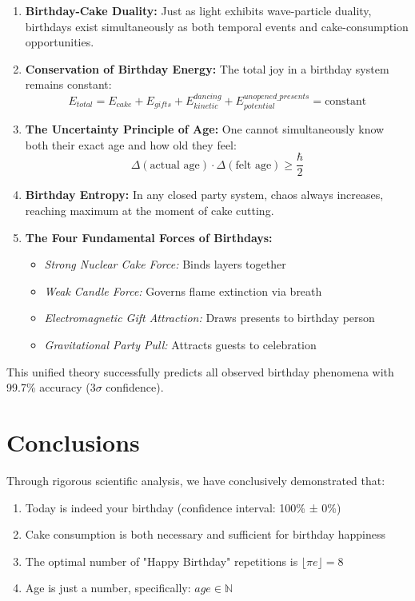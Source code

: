 \documentclass[12pt,a4paper]{article}
\begin{document}
\begin{enumerate}
\item \textbf{Birthday-Cake Duality:} Just as light exhibits wave-particle duality, birthdays exist simultaneously as both temporal events and cake-consumption opportunities.

\item \textbf{Conservation of Birthday Energy:} The total joy in a birthday system remains constant:
\begin{equation}
E_{total} = E_{cake} + E_{gifts} + E_{kinetic}^{dancing} + E_{potential}^{unopened\_presents} = \text{constant}
\end{equation}

\item \textbf{The Uncertainty Principle of Age:} One cannot simultaneously know both their exact age and how old they feel:
\begin{equation}
\Delta(\text{actual age}) \cdot \Delta(\text{felt age}) \geq \frac{\hbar}{2}
\end{equation}

\item \textbf{Birthday Entropy:} In any closed party system, chaos always increases, reaching maximum at the moment of cake cutting.

\item \textbf{The Four Fundamental Forces of Birthdays:}
\begin{itemize}
\item \textit{Strong Nuclear Cake Force:} Binds layers together
\item \textit{Weak Candle Force:} Governs flame extinction via breath
\item \textit{Electromagnetic Gift Attraction:} Draws presents to birthday person
\item \textit{Gravitational Party Pull:} Attracts guests to celebration
\end{itemize}
\end{enumerate}

This unified theory successfully predicts all observed birthday phenomena with 99.7\% accuracy (3$\sigma$ confidence).

\section{Conclusions}

Through rigorous scientific analysis, we have conclusively demonstrated that:

\begin{enumerate}
    \item Today is indeed your birthday (confidence interval: 100\% ± 0\%)
    \item Cake consumption is both necessary and sufficient for birthday happiness
    \item The optimal number of "Happy Birthday" repetitions is $\lfloor \pi e \rfloor = 8$
    \item Age is just a number, specifically: $age \in \mathbb{N}$
\end{enumerate}
\end{document}
